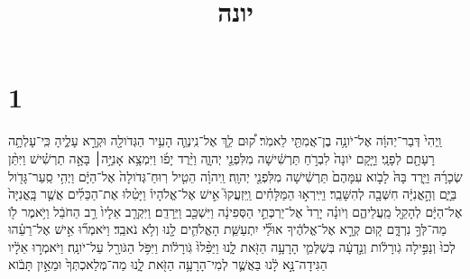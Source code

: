 \documentclass{openreader}
\title{יונה}
\date{}
\begin{document}
\maketitle
\raggedbottom 
\fontsize{16pt}{24pt}\selectfont
\section*{1}
וַֽיְהִי֙ דְּבַר־יְהוָ֔ה אֶל־יֹונָ֥ה בֶן־אֲמִתַּ֖י לֵאמֹֽר׃ ק֠וּם לֵ֧ךְ אֶל־נִֽינְוֵ֛ה הָעִ֥יר הַגְּדֹולָ֖ה וּקְרָ֣א עָלֶ֑יהָ כִּֽי־עָלְתָ֥ה רָעָתָ֖ם לְפָנָֽי׃ וַיָּ֤קָם יֹונָה֙ לִבְרֹ֣חַ תַּרְשִׁ֔ישָׁה מִלִּפְנֵ֖י יְהוָ֑ה וַיֵּ֨רֶד יָפֹ֜ו וַיִּמְצָ֥א אָנִיָּ֣ה׀ בָּאָ֣ה תַרְשִׁ֗ישׁ וַיִּתֵּ֨ן שְׂכָרָ֜הּ וַיֵּ֤רֶד בָּהּ֙ לָבֹ֤וא עִמָּהֶם֙ תַּרְשִׁ֔ישָׁה מִלִּפְנֵ֖י יְהוָֽה׃ וַֽיהוָ֗ה הֵטִ֤יל רֽוּחַ־גְּדֹולָה֙ אֶל־הַיָּ֔ם וַיְהִ֥י סַֽעַר־גָּדֹ֖ול בַּיָּ֑ם וְהָ֣אֳנִיָּ֔ה חִשְּׁבָ֖ה לְהִשָּׁבֵֽר׃ וַיִּֽירְא֣וּ הַמַּלָּחִ֗ים וַֽיִּזְעֲקוּ֮ אִ֣ישׁ אֶל־אֱלֹהָיו֒ וַיָּטִ֨לוּ אֶת־הַכֵּלִ֜ים אֲשֶׁ֤ר בָּֽאֳנִיָּה֙ אֶל־הַיָּ֔ם לְהָקֵ֖ל מֵֽעֲלֵיהֶ֑ם וְיֹונָ֗ה יָרַד֙ אֶל־יַרְכְּתֵ֣י הַסְּפִינָ֔ה וַיִּשְׁכַּ֖ב וַיֵּרָדַֽם׃ וַיִּקְרַ֤ב אֵלָיו֙ רַ֣ב הַחֹבֵ֔ל וַיֹּ֥אמֶר לֹ֖ו מַה־לְּךָ֣ נִרְדָּ֑ם ק֚וּם קְרָ֣א אֶל־אֱלֹהֶ֔יךָ אוּלַ֞י יִתְעַשֵּׁ֧ת הָאֱלֹהִ֛ים לָ֖נוּ וְלֹ֥א נֹאבֵֽד׃ וַיֹּאמְר֞וּ אִ֣ישׁ אֶל־רֵעֵ֗הוּ לְכוּ֙ וְנַפִּ֣ילָה גֹֽורָלֹ֔ות וְנֵ֣דְעָ֔ה בְּשֶׁלְּמִ֛י הָרָעָ֥ה הַזֹּ֖את לָ֑נוּ וַיַּפִּ֨לוּ֙ גֹּֽורָלֹ֔ות וַיִּפֹּ֥ל הַגֹּורָ֖ל עַל־יֹונָֽה׃ וַיֹּאמְר֣וּ אֵלָ֔יו הַגִּידָה־נָּ֣א לָ֔נוּ בַּאֲשֶׁ֛ר לְמִי־הָרָעָ֥ה הַזֹּ֖את לָ֑נוּ מַה־מְּלַאכְתְּךָ֙ וּמֵאַ֣יִן תָּבֹ֔וא 
\end{document}
